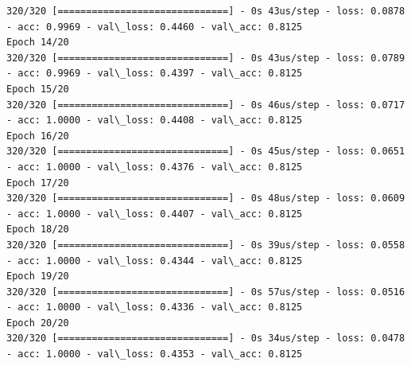 \documentclass[11pt]{article}
\begin{document}
\begin{Verbatim}[commandchars=\\\{\}]
320/320 [==============================] - 0s 43us/step - loss: 0.0878 - acc: 0.9969 - val\_loss: 0.4460 - val\_acc: 0.8125
Epoch 14/20
320/320 [==============================] - 0s 43us/step - loss: 0.0789 - acc: 0.9969 - val\_loss: 0.4397 - val\_acc: 0.8125
Epoch 15/20
320/320 [==============================] - 0s 46us/step - loss: 0.0717 - acc: 1.0000 - val\_loss: 0.4408 - val\_acc: 0.8125
Epoch 16/20
320/320 [==============================] - 0s 45us/step - loss: 0.0651 - acc: 1.0000 - val\_loss: 0.4376 - val\_acc: 0.8125
Epoch 17/20
320/320 [==============================] - 0s 48us/step - loss: 0.0609 - acc: 1.0000 - val\_loss: 0.4407 - val\_acc: 0.8125
Epoch 18/20
320/320 [==============================] - 0s 39us/step - loss: 0.0558 - acc: 1.0000 - val\_loss: 0.4344 - val\_acc: 0.8125
Epoch 19/20
320/320 [==============================] - 0s 57us/step - loss: 0.0516 - acc: 1.0000 - val\_loss: 0.4336 - val\_acc: 0.8125
Epoch 20/20
320/320 [==============================] - 0s 34us/step - loss: 0.0478 - acc: 1.0000 - val\_loss: 0.4353 - val\_acc: 0.8125

    \end{Verbatim}
\end{document}

